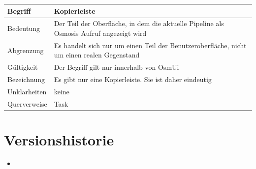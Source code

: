 \documentclass[a4paper,12pt]{scrartcl}
\begin{document}
\begin{center}
\begin{tabular}{|p{5cm}|p{10cm}|}
\hline Begriff & \textbf{Kopierleiste} \\ 
\hline Bedeutung & Der Teil der Oberfläche, in dem die aktuelle Pipeline als Osmosis Aufruf angezeigt wird \\ 
\hline Abgrenzung & Es handelt sich nur um einen Teil der Benutzeroberfläche, nicht um einen realen Gegenstand \\ 
\hline Gültigkeit & Der Begriff gilt nur innerhalb von OsmUi \\ 
\hline Bezeichnung & Es gibt nur eine Kopierleiste. Sie ist daher eindeutig \\ 
\hline Unklarheiten & keine \\ 
\hline Querverweise & Task \\ 
\hline 
\end{tabular}
\end{center}
\section{Versionshistorie}
\begin{itemize}
\item 
\end{itemize}
\end{document}
